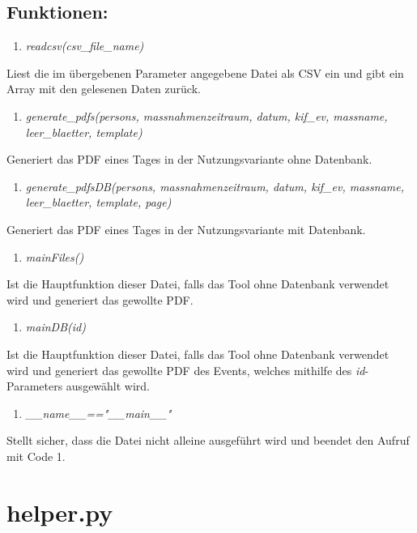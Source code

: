\documentclass[12pt,parskip=full, pagea4]{scrreprt}
\begin{document}
			\subsection{Funktionen:}
			\begin{enumerate}[resume]
				\item \textit{readcsv(csv\_file\_name)}
			\end{enumerate}
			\leftskip=1.5cm	Liest die im \"ubergebenen Parameter angegebene Datei als CSV ein und gibt ein Array mit den gelesenen Daten zur\"uck.
			\begin{enumerate}[resume]
				\item \textit{generate\_pdfs(persons, massnahmenzeitraum, datum, kif\_ev, massname, leer\_blaetter, template)}
			\end{enumerate}
			\leftskip=1.5cm Generiert das PDF eines Tages in der Nutzungsvariante ohne Datenbank.
			\begin{enumerate}[resume]
				\item \textit{generate\_pdfsDB(persons, massnahmenzeitraum, datum, kif\_ev, massname, leer\_blaetter, template, page)}
			\end{enumerate}
			\leftskip=1.5cm	Generiert das PDF eines Tages in der Nutzungsvariante mit Datenbank.
			\begin{enumerate}[resume]
				\item \textit{mainFiles()}
			\end{enumerate}
			\leftskip=1.5cm	Ist die Hauptfunktion dieser Datei, falls das Tool ohne Datenbank verwendet wird und generiert das gewollte PDF.
			\begin{enumerate}[resume]
				\item \textit{mainDB(id)}
			\end{enumerate}
			\leftskip=1.5cm	Ist die Hauptfunktion dieser Datei, falls das Tool ohne Datenbank verwendet wird und generiert das gewollte PDF des Events, welches mithilfe des \textit{id}-Parameters ausgew\"ahlt wird.
			\begin{enumerate}[resume]
				\item \textit{\_\_name\_\_=="\_\_main\_\_"}	
			\end{enumerate}
			\leftskip=1.5cm	Stellt sicher, dass die Datei nicht alleine ausgeführt wird und beendet den Aufruf mit Code 1.
			
			\leftskip=0cm

			\section{helper.py}
\end{document}

